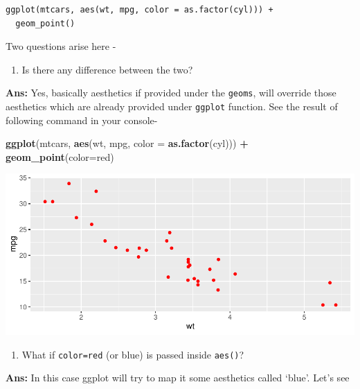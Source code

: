 \documentclass[
]{book}
\newenvironment{Shaded}{\begin{snugshade}}{\end{snugshade}}
\newcommand{\AttributeTok}[1]{\textcolor[rgb]{0.13,0.29,0.53}{#1}}
\newcommand{\FunctionTok}[1]{\textcolor[rgb]{0.13,0.29,0.53}{\textbf{#1}}}
\newcommand{\NormalTok}[1]{#1}
\newcommand{\SpecialCharTok}[1]{\textcolor[rgb]{0.81,0.36,0.00}{\textbf{#1}}}
\newcommand{\StringTok}[1]{\textcolor[rgb]{0.31,0.60,0.02}{#1}}
\providecommand{\tightlist}{%
  \setlength{\itemsep}{0pt}\setlength{\parskip}{0pt}}
\begin{document}
\begin{verbatim}
ggplot(mtcars, aes(wt, mpg, color = as.factor(cyl))) +
  geom_point()
\end{verbatim}

Two questions arise here -

\begin{enumerate}
\def\labelenumi{\arabic{enumi}.}
\tightlist
\item
  Is there any difference between the two?
\end{enumerate}

\textbf{Ans:} Yes, basically aesthetics if provided under the \texttt{geoms}, will override those aesthetics which are already provided under \texttt{ggplot} function. See the result of following command in your console-

\begin{Shaded}
\begin{Highlighting}[]
\FunctionTok{ggplot}\NormalTok{(mtcars, }\FunctionTok{aes}\NormalTok{(wt, mpg, }\AttributeTok{color =} \FunctionTok{as.factor}\NormalTok{(cyl))) }\SpecialCharTok{+}
  \FunctionTok{geom\_point}\NormalTok{(}\AttributeTok{color=}\StringTok{\textquotesingle{}red\textquotesingle{}}\NormalTok{)}
\end{Highlighting}
\end{Shaded}

\begin{center}\includegraphics{DauR_files/figure-latex/fig_8-1} \end{center}

\begin{enumerate}
\def\labelenumi{\arabic{enumi}.}
\setcounter{enumi}{1}
\tightlist
\item
  What if \texttt{color=\textquotesingle{}red\textquotesingle{}} (or blue) is passed inside \texttt{aes()}?
\end{enumerate}

\textbf{Ans:} In this case ggplot will try to map it some aesthetics called `blue'. Let's see
\end{document}
